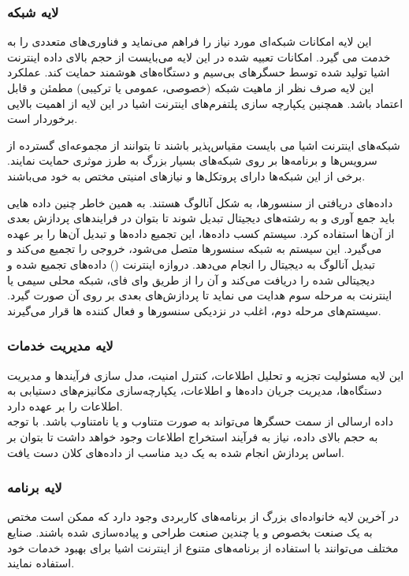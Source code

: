 \subsubsection{لایه شبکه}
این لایه امکانات شبکه‌ای مورد نیاز را فراهم می‌نماید و فناوری‌های متعددی را به خدمت می گیرد. امکانات تعبیه شده در این لایه می‌بایست از حجم بالای داده اینترنت اشیا تولید شده توسط حسگرهای بی‌سیم و دستگاه‌های هوشمند حمایت کند.
عملکرد این لایه صرف نظر از ماهیت شبکه (خصوصی، عمومی یا ترکیبی) مطمئن و قابل اعتماد باشد. همچنین یکپارچه سازی پلتفرم‌های اینترنت اشیا در این لایه از اهمیت بالایی برخوردار است.


شبکه‌های اینترنت اشیا می بایست مقیاس‌پذیر باشند تا بتوانند از مجموعه‌ای  گسترده از سرویس‌ها و برنامه‌ها بر روی شبکه‌های بسیار بزرگ به طرز موثری حمایت نمایند. برخی از این شبکه‌ها دارای پروتکل‌ها و نیازهای امنیتی مختص به خود می‌باشند.


داده‌های دریافتی از سنسورها، به شکل آنالوگ هستند. به همین خاطر چنین داده هایی باید جمع آوری و به رشته‌های دیجیتال تبدیل شوند تا بتوان در فرایندهای پردازش بعدی از آن‌ها استفاده کرد. سیستم کسب داده‌ها، این تجمیع داده‌ها و تبدیل آن‌ها را بر عهده می‌گیرد. این سیستم به شبکه سنسورها متصل می‌شود، خروجی را تجمیع می‌کند و تبدیل آنالوگ به دیجیتال را انجام می‌دهد.  دروازه اینترنت () داده‌های تجمیع شده و دیجیتالی شده را دریافت می‌کند و آن را از  طریق وای فای، شبکه محلی سیمی یا اینترنت به مرحله سوم هدایت می نماید تا پردازش‌های بعدی بر روی آن صورت گیرد. سیستم‌های مرحله دوم، اغلب در نزدیکی سنسورها و فعال کننده ها قرار می‌گیرند.
\subsubsection{لایه مدیریت خدمات}
این لایه مسئولیت تجزیه و تحلیل اطلاعات، کنترل امنیت، مدل سازی فرآیندها و مدیریت دستگاه‌ها، مدیریت جریان داده‌ها و اطلاعات، یکپارچه‌سازی مکانیزم‌های دستیابی به اطلاعات را بر عهده دارد. \\داده ارسالی از سمت حسگرها می‌تواند به صورت متناوب و یا نامتناوب باشد. با توجه به حجم بالای داده، نیاز به فرآیند استخراج اطلاعات وجود خواهد داشت تا بتوان بر اساس پردازش انجام شده به یک دید مناسب از داده‌های کلان دست یافت.
\subsubsection{لایه برنامه}
در آخرین لایه خانواده‌ای بزرگ از برنامه‌های کاربردی وجود دارد که ممکن است مختص به یک صنعت بخصوص و یا چندین صنعت طراحی و پیاده‌سازی شده باشند. صنایع مختلف می‌توانند با استفاده از برنامه‌های متنوع از اینترنت اشیا برای بهبود خدمات خود استفاده نمایند.


